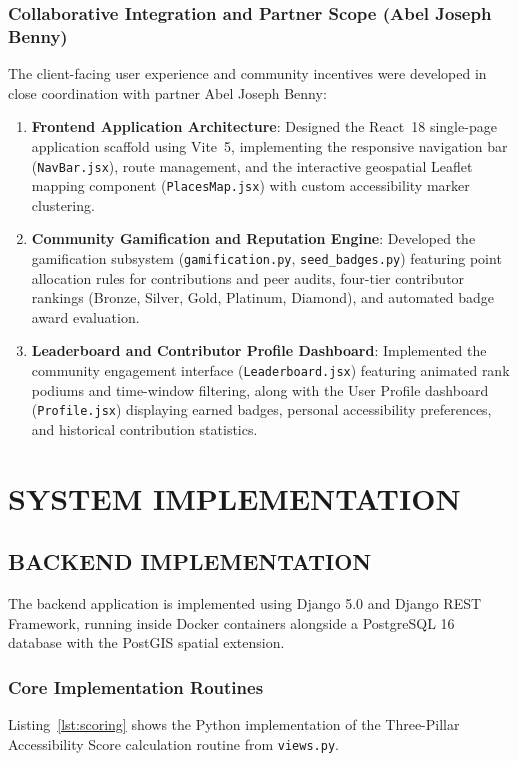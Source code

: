 \documentclass[12pt,a4paper]{report}
\begin{document}
\subsection{Collaborative Integration and Partner Scope (Abel Joseph Benny)}
The client-facing user experience and community incentives were developed in close coordination with partner Abel Joseph Benny:
\begin{enumerate}
    \item \textbf{Frontend Application Architecture}: Designed the React~18 single-page application scaffold using Vite~5, implementing the responsive navigation bar (\texttt{NavBar.jsx}), route management, and the interactive geospatial Leaflet mapping component (\texttt{PlacesMap.jsx}) with custom accessibility marker clustering.
    \item \textbf{Community Gamification and Reputation Engine}: Developed the gamification subsystem (\texttt{gamification.py}, \texttt{seed\_badges.py}) featuring point allocation rules for contributions and peer audits, four-tier contributor rankings (Bronze, Silver, Gold, Platinum, Diamond), and automated badge award evaluation.
    \item \textbf{Leaderboard and Contributor Profile Dashboard}: Implemented the community engagement interface (\texttt{Leaderboard.jsx}) featuring animated rank podiums and time-window filtering, along with the User Profile dashboard (\texttt{Profile.jsx}) displaying earned badges, personal accessibility preferences, and historical contribution statistics.
\end{enumerate}

\newpage
\chapter{SYSTEM IMPLEMENTATION}

\section{BACKEND IMPLEMENTATION}
The backend application is implemented using Django 5.0 and Django REST Framework, running inside Docker containers alongside a PostgreSQL 16 database with the PostGIS spatial extension.

\subsection{Core Implementation Routines}
Listing~\ref{lst:scoring} shows the Python implementation of the Three-Pillar Accessibility Score calculation routine from \texttt{views.py}.
\end{document}
